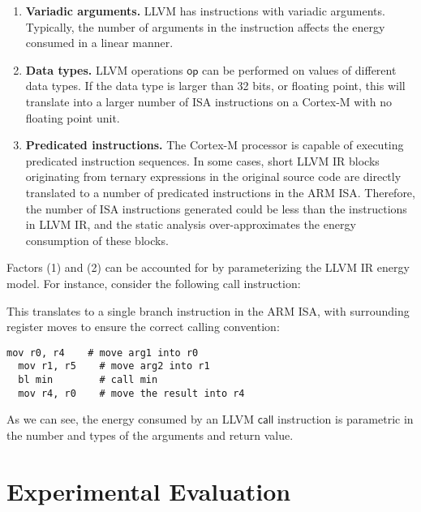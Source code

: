 \documentclass[9pt,preprint]{sigplanconf}
\newcommand{\mathspace}[1]{\ensuremath{#1}\xspace}
\newcommand{\instit}[1]{\mathspace{\mathsf{#1}}}
\newcommand{\op}{\instit{op}}
\newcommand{\call}{\instit{call}}
\begin{document}
\begin{enumerate}

\item \textbf{Variadic arguments.}  LLVM has instructions with variadic
arguments. Typically, the number of arguments in the instruction affects the
energy consumed in a linear manner.
\vspace{-1mm}
\item \textbf{Data types.} LLVM operations \op can be performed on values of
different data types. If the data type is larger than 32 bits, or floating
point, this will  translate into a larger number of ISA instructions on a
Cortex-M with no floating point unit.

\item \textbf{Predicated instructions.} The Cortex-M processor is capable of
executing predicated instruction sequences. In some cases, short LLVM IR blocks
originating from ternary expressions in the original source code are directly
translated to a number of predicated instructions in the ARM ISA. Therefore, the
number of ISA instructions generated could be less than the instructions in LLVM
IR, and the static analysis over-approximates the energy consumption of these
blocks.
\end{enumerate}

Factors (1) and (2) can be accounted for by parameterizing the LLVM IR energy
model. For instance, consider the following call instruction:
\begin{llvmcode}[numbers=none]
\end{llvmcode}
This translates to a single branch instruction in the ARM ISA, with surrounding
register moves to ensure the correct calling convention:

{\nocaptionrule
\begin{lstlisting}[morekeywords={mov,bl},morecomment={[l]\#}]
  mov r0, r4    # move arg1 into r0
  mov r1, r5    # move arg2 into r1
  bl min        # call min
  mov r4, r0    # move the result into r4
\end{lstlisting}}
As we can see, the energy consumed by an LLVM \call instruction is
parametric in the number and types of the arguments and return value.

\section{Experimental Evaluation}
\end{document}
